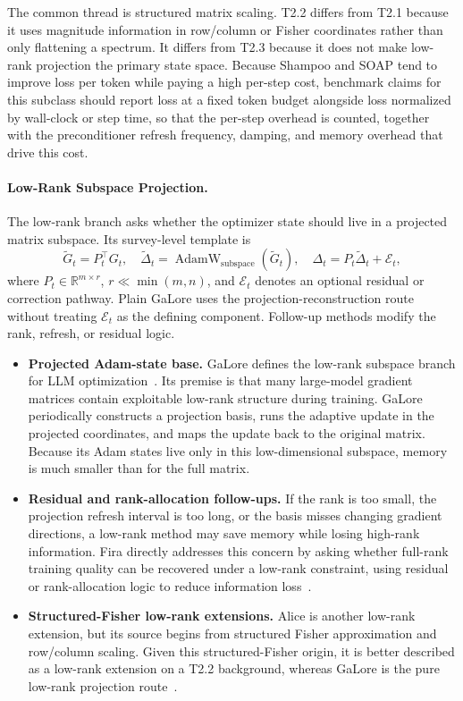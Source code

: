 The common thread is structured matrix scaling.  T2.2 differs from T2.1
because it uses magnitude information in row/column or Fisher coordinates
rather than only flattening a spectrum.  It differs from T2.3 because it does
not make low-rank projection the primary state space.  Because Shampoo and SOAP
tend to improve loss per token while paying a high per-step cost, benchmark
claims for this subclass should report loss at a fixed token budget alongside
loss normalized by wall-clock or step time, so that the per-step overhead is
counted, together with the preconditioner refresh frequency, damping, and
memory overhead that drive this cost.

\paragraph{Low-Rank Subspace Projection.}
\label{sec:t2-low-rank}

The low-rank branch asks whether the optimizer state should live in a
projected matrix subspace.  Its survey-level template is
\begin{equation}
  \widetilde{G}_t=P_t^\top G_t,\quad
  \widetilde{\Delta}_t
    = \operatorname{AdamW}_{\mathrm{subspace}}(\widetilde{G}_t),\quad
  \Delta_t=P_t\widetilde{\Delta}_t+\mathcal{E}_t,
  \label{eq:t2-lowrank-template}
\end{equation}
where $P_t\in\mathbb{R}^{m\times r}$, $r\ll\min(m,n)$, and
$\mathcal{E}_t$ denotes an optional residual or correction pathway.  Plain
GaLore uses the projection-reconstruction route without treating
$\mathcal{E}_t$ as the defining component.  Follow-up methods modify the rank,
refresh, or residual logic.
\begin{itemize}
  \setlength{\itemsep}{2pt}
  \item \textbf{Projected Adam-state base.}  GaLore defines the low-rank
  subspace branch for LLM optimization~\citep{zhao2024galore}.  Its premise is
  that many large-model gradient matrices contain exploitable low-rank
  structure during training.  GaLore periodically constructs a projection
  basis, runs the adaptive update in the projected coordinates, and maps the
  update back to the original matrix.  Because its Adam states live only in this
  low-dimensional subspace, memory is much smaller than for the full matrix.
  \item \textbf{Residual and rank-allocation follow-ups.}  If the rank is too
  small, the projection refresh interval is too long, or the basis misses
  changing gradient directions, a low-rank method may save memory while losing
  high-rank information.  Fira directly addresses this concern by asking
  whether full-rank training quality can be recovered under a low-rank
  constraint, using residual or rank-allocation logic to reduce information
  loss~\citep{chen2026fira}.
  \item \textbf{Structured-Fisher low-rank extensions.}  Alice is another
  low-rank extension, but its source begins from structured Fisher
  approximation and row/column scaling.  Given this structured-Fisher origin, it
  is better described as a low-rank extension on a T2.2 background, whereas
  GaLore is the pure low-rank projection route~\citep{gong2025towards}.
\end{itemize}


